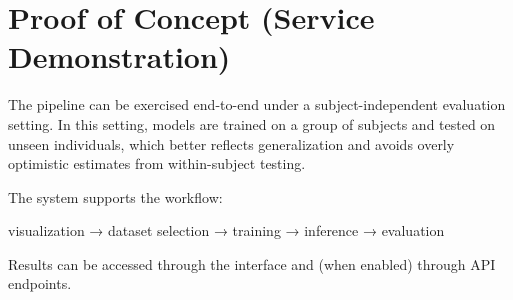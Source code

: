 \section{Proof of Concept (Service Demonstration)}
\label{sec:proof-of-concept}
The pipeline can be exercised end-to-end under a subject-independent evaluation setting.
In this setting, models are trained on a group of subjects and tested on unseen individuals, which better reflects generalization and avoids overly optimistic estimates from within-subject testing.

The system supports the workflow:

visualization → dataset selection → training → inference → evaluation

Results can be accessed through the interface and (when enabled) through API endpoints.




